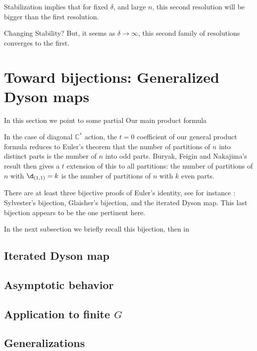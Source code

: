 \documentclass{amsart}[12pt]
\theoremstyle{definition}
\newcommand{\C}{\mathbb{C}}
\begin{document}
Stabilization implies that for fixed $\delta$, and large $n$, this second resolution will be bigger than the first resolution.

Changing Stability?
But, it seems as $\delta\to\infty$, this second family of resolutions converges to the first.

\section{Toward bijections: Generalized Dyson maps}

In this section we point to some partial Our main product formula 

In the case of diagonal $\C^*$ action, the $t=0$ coefficient of our general product formula reduces to Euler's theorem that the number of partitions of $n$ into distinct parts is the number of $n$ into odd parts.  Buryak, Feigin and Nakajima's result then gives a $t$ extension of this to all partitions: the number of partitions of $n$ with $\d_{(1,1)}=k$ is the number of partitions of $n$ with $k$ even parts.

There are at least three bijective proofs of Euler's identity, see for instance \cite{pak}: Sylvester's bijection, Glaisher's bijection, and the iterated Dyson map.  This last bijection appears to be the one pertinent here.

In the next subsection we briefly recall this bijection, then in 
\subsection{Iterated Dyson map} \label{sec:review-dyson}


\subsection{Asymptotic behavior} \label{sec-asymptotic-dyson}

\subsection{Application to finite $G$} 


\subsection{Generalizations} \label{sec:generalized-dyson}






\end{document}
